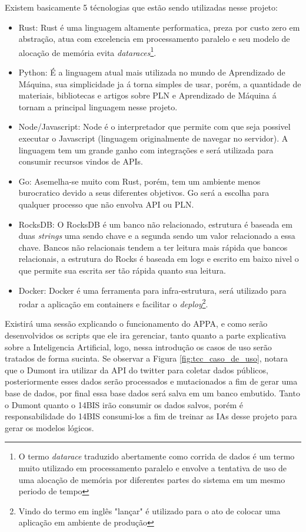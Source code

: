 Existem basicamente 5 técnologias que estão sendo utilizadas nesse projeto:
\begin{itemize}
 \item Rust: Rust é uma linguagem altamente performatica, preza por custo zero em abstração, atua com excelencia em processamento paralelo e seu modelo de alocação de memória evita \textit{dataraces}\footnote{O termo \textit{datarace} traduzido abertamente como corrida de dados é um termo muito utilizado em processamento paralelo e envolve a tentativa de uso de uma alocação de memória por diferentes partes do sistema em um mesmo periodo de tempo}.
 \item Python: É a linguagem atual mais utilizada no mundo de Aprendizado de Máquina, sua simplicidade ja á torna simples de usar, porém, a quantidade de materiais, bibliotecas e artigos sobre PLN e Aprendizado de Máquina á tornam a principal linguagem nesse projeto.
 \item Node/Javascript: Node é o interpretador que permite com que seja possivel executar o Javascript (linguagem originalmente de navegar no servidor). A linguagem tem um grande ganho com integrações e será utilizada para consumir recursos vindos de APIs.
 \item Go: Asemelha-se muito com Rust, porém, tem um ambiente menos burocratico devido a seus diferentes objetivos. Go será a escolha para qualquer processo que não envolva API ou PLN.
 \item RocksDB: O RocksDB é um banco não relacionado, estrutura é baseada em duas \textit{strings} uma sendo chave e a segunda sendo um valor relacionado a essa chave. Bancos não relacionais tendem a ter leitura mais rápida que bancos relacionais, a estrutura do Rocks é baseada em logs e escrito em baixo nivel o que permite sua escrita ser tão rápida quanto sua leitura.
 \item Docker: Docker é uma ferramenta para infra-estrutura, será utilizado para rodar a aplicação em containers e facilitar o \textit{deploy}\footnote{Vindo do termo em inglês "lançar" é utilizado para o ato de colocar uma aplicação em ambiente de produção}.
\end{itemize}

Existirá uma sessão explicando o funcionamento do APPA, e como serão desenvolvidos os scripts que ele ira gerenciar, tanto quanto a parte explicativa sobre a Inteligencia Artificial, logo, nessa introdução os casos de uso serão tratados de forma sucinta. Se observar a Figura \ref{fig:tcc_caso_de_uso}, notara que o Dumont ira utilizar da API do twitter para coletar dados públicos, posteriormente esses dados serão processados e mutacionados a fim de gerar uma base de dados, por final essa base dados será salva em um banco embutido. Tanto o Dumont quanto o 14BIS irão consumir os dados salvos, porém é responsabilidade do 14BIS consumi-los a fim de treinar as IAs desse projeto para gerar os modelos lógicos.

